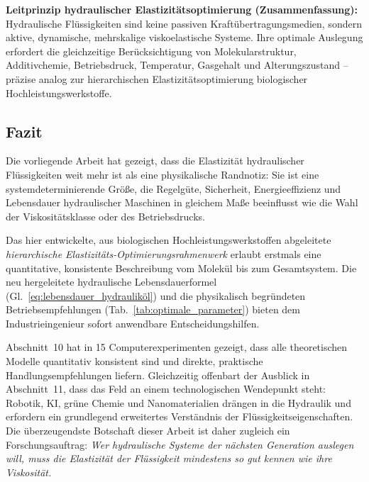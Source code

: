 ﻿\documentclass[a4paper,12pt]{scrreprt}
\theoremstyle{definition}
\begin{document}
\begin{infobox}
\textbf{Leitprinzip hydraulischer Elastizitätsoptimierung (Zusammenfassung):}
Hydraulische Flüssigkeiten sind keine passiven Kraftübertragungsmedien,
sondern aktive, dynamische, mehrskalige viskoelastische Systeme. Ihre
optimale Auslegung erfordert die gleichzeitige Berücksichtigung von
Molekularstruktur, Additivchemie, Betriebsdruck, Temperatur, Gasgehalt
und Alterungszustand -- präzise analog zur hierarchischen
Elastizitätsoptimierung biologischer Hochleistungswerkstoffe.
\end{infobox}

\subsection*{Fazit}

Die vorliegende Arbeit hat gezeigt, dass die Elastizität hydraulischer
Flüssigkeiten weit mehr ist als eine physikalische Randnotiz: Sie ist
eine systemdeterminierende Größe, die Regelgüte, Sicherheit, Energie\-effizienz
und Lebensdauer hydraulischer Maschinen in gleichem Maße beeinflusst
wie die Wahl der Viskositätsklasse oder des Betriebsdrucks.

Das hier entwickelte, aus biologischen Hochleistungswerkstoffen abgeleitete
\emph{hierarchische Elastizitäts-Optimierungsrahmenwerk} erlaubt erstmals
eine quantitative, konsistente Beschreibung vom Molekül bis zum Gesamtsystem.
Die neu hergeleitete hydraulische Lebensdauerformel
(Gl.~\eqref{eq:lebensdauer_hydrauliköl}) und die physikalisch begründeten
Betriebsempfehlungen (Tab.~\ref{tab:optimale_parameter}) bieten dem
Industrieingenieur sofort anwendbare Entscheidungshilfen.

Abschnitt~10 hat in 15 Computerexperimenten gezeigt, dass alle
theoretischen Modelle quantitativ konsistent sind und direkte,
praktische Handlungsempfehlungen liefern. Gleichzeitig offenbart
der Ausblick in Abschnitt~11, dass das Feld an einem technologischen
Wendepunkt steht: Robotik, KI, grüne Chemie und Nano\-materialien
drängen in die Hydraulik und erfordern ein grundlegend erweitertes
Verständnis der Flüssigkeitseigenschaften.
Die überzeugendste Botschaft dieser Arbeit ist daher zugleich
ein Forschungsauftrag: \emph{Wer hydraulische Systeme der nächsten
Generation auslegen will, muss die Elastizität der Flüssigkeit
mindestens so gut kennen wie ihre Viskosität.}

\clearpage
\end{document}
